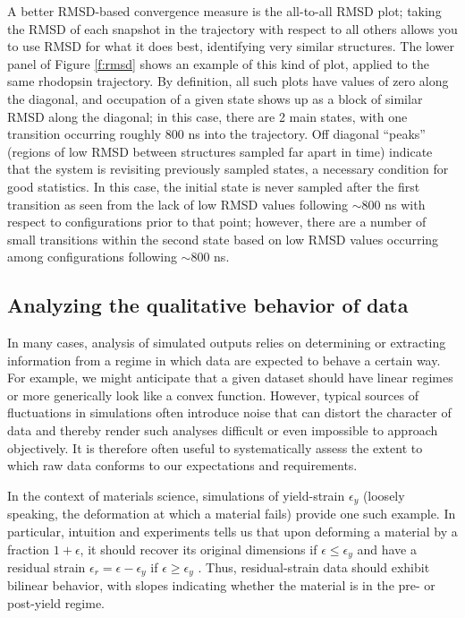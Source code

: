 A better RMSD-based convergence measure is the all-to-all RMSD plot; taking the
RMSD of each snapshot in the trajectory with respect to all others allows you to
use RMSD for what it does best, identifying very similar structures.  The lower
panel of Figure \ref{f:rmsd} shows an example of this kind of plot, applied to
the same rhodopsin trajectory.  By definition, all such plots have values of zero
along the diagonal, and occupation of a given state shows up as a block of
similar RMSD along the diagonal; in this case, there are 2 main states, with one
transition occurring roughly 800 ns into the trajectory.  Off diagonal ``peaks''
(regions of low RMSD between structures sampled far apart in time) indicate that
the system is revisiting previously sampled states, a necessary condition for
good statistics.  In this case, the initial state is never sampled after the
first transition as seen from the lack of low RMSD values following $\sim$800 ns with respect to configurations prior to that point;
however, there are a number of small transitions within the second state based on low RMSD values occurring among configurations following $\sim$800 ns.

\subsection{Analyzing the qualitative behavior of data}

In many cases, analysis of simulated outputs relies on determining or extracting information from a regime in which data are expected to behave a certain way.  For example, we might anticipate that a given dataset should have linear regimes or more generically look like a convex function.  However, typical sources of fluctuations in simulations often introduce noise that can distort the character of data and thereby render such analyses difficult or even impossible to approach objectively.  It is therefore often useful to systematically assess the extent to which raw data conforms to our expectations and requirements.

In the context of materials science, simulations of yield-strain $\epsilon_y$ (loosely speaking, the deformation at which a material fails) provide one such example.  In particular, intuition and experiments tells us that upon deforming a material by a fraction $1+\epsilon$, it should recover its original dimensions if $\epsilon \le \epsilon_y$ and have a residual strain $\epsilon_r = \epsilon - \epsilon_y$ if $\epsilon \ge \epsilon_y$ \cite{patrone2}.  Thus, residual-strain data should exhibit bilinear behavior, with slopes indicating whether the material is in the pre- or post-yield regime.

